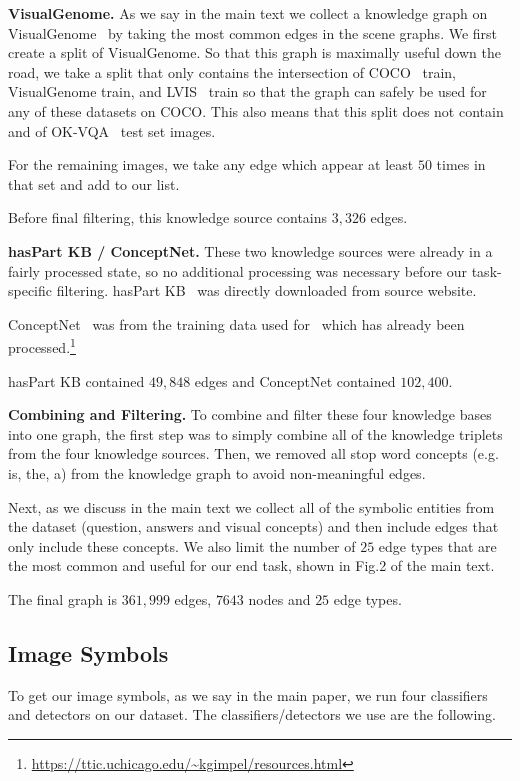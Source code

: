 \documentclass[final]{cvpr}
\providecommand{\myparagraph}[1]{\noindent\textbf{#1.}}
\begin{document}
\myparagraph{VisualGenome}
As we say in the main text we collect a knowledge graph on VisualGenome~\cite{krishnavisualgenome} by taking the most common edges in the scene graphs. We first create a split of VisualGenome. So that this graph is maximally useful down the road, we take a split that only contains the intersection of COCO~\cite{LinMBHPRDZ14} train, VisualGenome train, and LVIS~\cite{gupta2019lvis} train so that the graph can safely be used for any of these datasets on COCO. This also means that this split does not contain and of OK-VQA~\cite{marino19cvpr} test set images.

For the remaining images, we take any edge which appear at least $50$ times in that set and add to our list.

Before final filtering, this knowledge source contains $3,326$ edges.

\myparagraph{hasPart KB / ConceptNet}
These two knowledge sources were already in a fairly processed state, so no additional processing was necessary before our task-specific filtering. hasPart KB~\cite{bhakthavatsalam2020dogs} was directly downloaded from source website.

ConceptNet~\cite{liu2004conceptnet} was from the training data used for~\cite{li2016commonsense} which has already been processed.\footnote{\url{https://ttic.uchicago.edu/~kgimpel/resources.html}}

hasPart KB contained $49,848$ edges and ConceptNet contained $102,400$.

\myparagraph{Combining and Filtering}
To combine and filter these four knowledge bases into one graph, the first step was to simply combine all of the knowledge triplets from the four knowledge sources. Then, we removed all stop word concepts (e.g. is, the, a) from the knowledge graph to avoid non-meaningful edges.

Next, as we discuss in the main text we collect all of the symbolic entities from the dataset (question, answers and visual concepts) and then include edges that only include these concepts. We also limit the number of $25$ edge types that are the most common and useful for our end task, shown in Fig.2 of the main text.

The final graph is $361,999$ edges, $7643$ nodes and $25$ edge types.

\subsection{Image Symbols}
\label{appx:imagesymbols}
To get our image symbols, as we say in the main paper, we run four classifiers and detectors on our dataset. The classifiers/detectors we use are the following.
\end{document}
